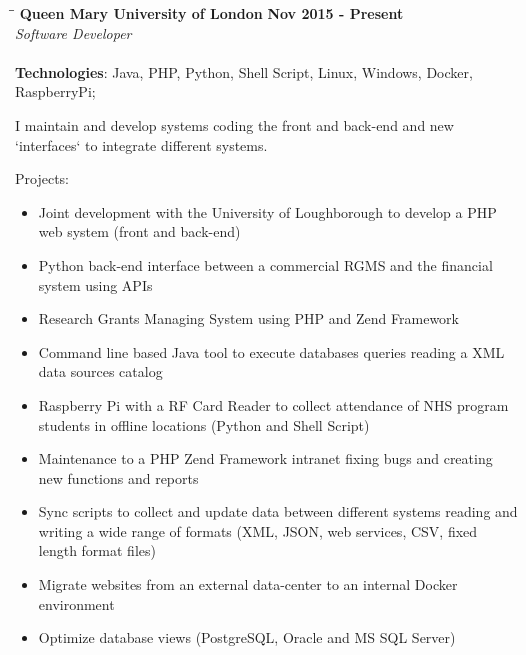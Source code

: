 \documentclass[margin]{res}
\begin{document}
\begin{resume}
\vspace{-0.1in}
   \begin{tabbing}
   \hspace{2.3in}\= \hspace{1.7in}\= \kill %
    \textbf{Queen Mary University of London}    \>\>\textbf{Nov 2015 - Present}\\
    \textit{Software Developer}\\ \\       
    \textbf{Technologies}: Java, PHP, Python, Shell Script, Linux, Windows, Docker, RaspberryPi;
   \end{tabbing}\vspace{-20pt}      %
    \vspace{2mm}
    I maintain and develop systems coding the front and back-end and new `interfaces` to integrate different systems. 

    Projects:
    \begin{itemize}
      \item Joint development with the University of Loughborough to develop a PHP web system (front and back-end)
      \item Python back-end interface between a commercial RGMS and the financial system using APIs
      \item Research Grants Managing System using PHP and Zend Framework
      \item Command line based Java tool to execute databases queries reading a XML data sources catalog
      \item Raspberry Pi with a RF Card Reader to collect attendance of NHS program students in offline locations (Python and Shell Script)
      \item Maintenance to a PHP Zend Framework intranet fixing bugs and creating new functions and reports
      \item Sync scripts to collect and update data between different systems reading and writing a wide range of formats (XML, JSON, web services, CSV, fixed length format files)
      \item Migrate websites from an external data-center to an internal Docker environment
      \item Optimize database views (PostgreSQL, Oracle and MS SQL Server)
    \end{itemize}

\vspace{5.0in}




\end{resume}
\end{document}
